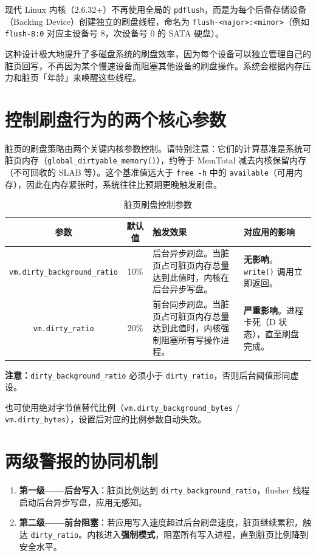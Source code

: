 现代 Linux 内核（2.6.32+）不再使用全局的 \texttt{pdflush}，而是为每个后备存储设备（Backing Device）创建独立的刷盘线程，命名为 \texttt{flush-<major>:<minor>}（例如 \texttt{flush-8:0} 对应主设备号 8，次设备号 0 的 SATA 硬盘）。

这种设计极大地提升了多磁盘系统的刷盘效率，因为每个设备可以独立管理自己的脏页回写，不再因为某个慢速设备而阻塞其他设备的刷盘操作。系统会根据内存压力和脏页「年龄」来唤醒这些线程。

\section{控制刷盘行为的两个核心参数}

脏页的刷盘策略由两个关键内核参数控制。请特别注意：它们的计算基准是系统可脏页内存（\texttt{global\_dirtyable\_memory()}），约等于 MemTotal 减去内核保留内存（不可回收的 SLAB 等）。这个基准值远大于 \texttt{free -h} 中的 \texttt{available}（可用内存），因此在内存紧张时，系统往往比预期更晚触发刷盘。

\begin{table}[htbp]
\centering
\caption{脏页刷盘控制参数}
\begin{tabular}{@{}c c p{6cm} p{4cm}@{}}
\toprule
\textbf{参数} & \textbf{默认值} & \textbf{触发效果} & \textbf{对应用的影响} \\
\midrule
\texttt{vm.dirty\_background\_ratio} & 10\% & 后台异步刷盘。当脏页占可脏页内存总量达到此值时，内核在后台异步写盘。 & \textbf{无影响}。\texttt{write()} 调用立即返回。 \\
\addlinespace
\texttt{vm.dirty\_ratio} & 20\% & 前台同步刷盘。当脏页占可脏页内存总量达到此值时，内核强制阻塞所有写操作进程。 & \textbf{严重影响}。进程卡死（D 状态），直至刷盘完成。 \\
\bottomrule
\end{tabular}
\end{table}

\textbf{注意：}\texttt{dirty\_background\_ratio} 必须小于 \texttt{dirty\_ratio}，否则后台阈值形同虚设。

也可使用绝对字节值替代比例（\texttt{vm.dirty\_background\_bytes} / \texttt{vm.dirty\_bytes}），设置后对应的比例参数自动失效。

\section{两级警报的协同机制}

\begin{enumerate}[leftmargin=2cm]
	\item \textbf{第一级——后台写入}：脏页比例达到 \texttt{dirty\_background\_ratio}，flusher 线程启动后台异步写盘，应用无感知。
	\item \textbf{第二级——前台阻塞}：若应用写入速度超过后台刷盘速度，脏页继续累积，触达 \texttt{dirty\_ratio}。内核进入\textbf{强制模式}，阻塞所有写入进程，直到脏页比例降到安全水平。
\end{enumerate}

